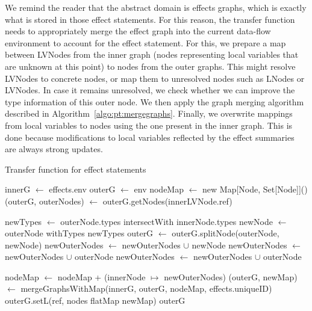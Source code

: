 \documentclass[a4paper]{article}
\begin{document}
We remind the reader that the abstract domain is effects graphs, which is
exactly what is stored in those effect statements. For this reason, the
transfer function needs to appropriately merge the effect graph into the
current data-flow environment to account for the effect statement. For this,
we prepare a map between LVNodes from the inner graph (nodes representing local
variables that are unknown at this point) to nodes from the outer graphs. This
might resolve LVNodes to concrete nodes, or map them to unresolved nodes such
as LNodes or LVNodes. In case it remains unresolved, we check whether we can improve
the type information of this outer node. We then apply the graph merging
algorithm described in Algorithm~\ref{algo:pt:mergegraphs}. Finally, we
overwrite mappings from local variables to nodes using the one present in the
inner graph. This is done because modifications to local variables reflected by
the effect summaries are always strong updates.

\begin{algorithm}
\caption{Transfer function for effect statements}\label{algo:pt:effects}
\begin{algorithmic}[1]
    \State innerG $\gets$ effects.env
    \State outerG $\gets$ env
    \State nodeMap $\gets$ new Map[Node, Set[Node]]()
        \State (outerG, outerNodes) $\gets$ outerG.getNodes(innerLVNode.ref)

                \State newTypes $\gets$ outerNode.types intersectWith innerNode.types
                    \State newNode $\gets$ outerNode withTypes newTypes
                    \State outerG $\gets$ outerG.splitNode(outerNode, newNode)
                    \State newOuterNodes $\gets$ newOuterNodes $\cup$ newNode
                \Else
                    \State newOuterNodes $\gets$ newOuterNodes $\cup$ outerNode
                \EndIf
            \Else
                \State newOuterNodes $\gets$ newOuterNodes $\cup$ outerNode
            \EndIf

        \EndFor
        \State nodeMap $\gets$ nodeMap + (innerNode $\mapsto$ newOuterNodes)
    \EndFor
    \State
    \State (outerG, newMap) $\gets$ mergeGraphsWithMap(innerG, outerG, nodeMap, effects.uniqueID)
    \State
        \State outerG.setL(ref, nodes flatMap newMap)
    \EndFor
    \State
    \State \Return outerG
\EndFunction
\end{algorithmic}
\end{algorithm}
\end{document}
